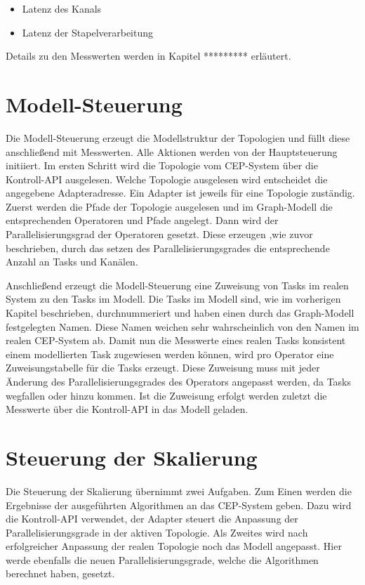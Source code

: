 \begin{itemize}
\item{Latenz des Kanals}
\item{Latenz der Stapelverarbeitung}
\end{itemize}

Details zu den Messwerten werden in Kapitel ********* erläutert.

\section{Modell-Steuerung}

Die Modell-Steuerung erzeugt die Modellstruktur der Topologien und füllt diese anschließend mit Messwerten.
Alle Aktionen werden von der Hauptsteuerung initiiert.
Im ersten Schritt wird die Topologie vom CEP-System über die Kontroll-API ausgelesen.
Welche Topologie ausgelesen wird entscheidet die angegebene Adapteradresse.
Ein Adapter ist jeweils für eine Topologie zuständig.
Zuerst werden die Pfade der Topologie ausgelesen und im Graph-Modell die entsprechenden Operatoren und Pfade angelegt.
Dann wird der Parallelisierungsgrad der Operatoren gesetzt.
Diese erzeugen ,wie zuvor beschrieben, durch das setzen des Parallelisierungsgrades die entsprechende Anzahl an Tasks und Kanälen.

Anschließend erzeugt die Modell-Steuerung eine Zuweisung von Tasks im realen System zu den Tasks im Modell.
Die Tasks im Modell sind, wie im vorherigen Kapitel beschrieben, durchnummeriert und haben einen durch das Graph-Modell festgelegten Namen.
Diese Namen weichen sehr wahrscheinlich von den Namen im realen CEP-System ab.
Damit nun die Messwerte eines realen Tasks konsistent einem modellierten Task zugewiesen werden können, wird pro Operator eine Zuweisungstabelle für die Tasks erzeugt.
Diese Zuweisung muss mit jeder Änderung des Parallelisierungsgrades des Operators angepasst werden, da Tasks wegfallen oder hinzu kommen.
Ist die Zuweisung erfolgt werden zuletzt die Messwerte über die Kontroll-API in das Modell geladen.

\section{Steuerung der Skalierung}

Die Steuerung der Skalierung übernimmt zwei Aufgaben.
Zum Einen werden die Ergebnisse der ausgeführten Algorithmen an das CEP-System geben.
Dazu wird die Kontroll-API verwendet, der Adapter steuert die Anpassung der Parallelisierungsgrade in der aktiven Topologie.
Als Zweites wird nach erfolgreicher Anpassung der realen Topologie noch das Modell angepasst.
Hier werde ebenfalls die neuen Parallelisierungsgrade, welche die Algorithmen berechnet haben, gesetzt.

